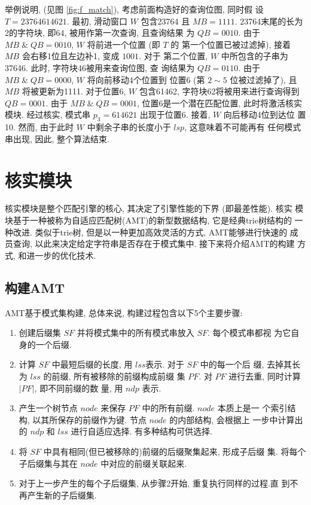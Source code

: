 \documentclass{ws-ijprai}
\begin{document}
举例说明, (见图 \ref{fig:f_match}), 考虑前面构造好的查询位图, 同时假
设 $T=23764614621$.  最初, 滑动窗口 $W$ 包含23764 且 $MB = 1111$.
23764末尾的长为2的字符块, 即64, 被用作第一次查询, 且查询结果
为 $QB=0010$. 由于 $MB\; \&\; QB = 0010$, $W$ 将前进一个位置 (即 $T$ 的
第一个位置已被过滤掉), 接着 $MB$ 会右移1位且左边补1, 变成 $1001$. 对于
第二个位置, $W$ 中所包含的子串为37646. 此时, 字符块46被用来查询位图, 查
询结果为 $QB=0110$. 由于 $MB\; \& \; QB=0000$, $W$ 将向前移动4个位置到
位置6 (第 $2 \sim 5$ 位被过滤掉了), 且 $MB$ 将被更新为1111. 对于位置6,
$W$ 包含61462, 字符块62将被用来进行查询得到 $QB = 0001$. 由于 $MB\; \&
\; QB = 0001$, 位置6是一个潜在匹配位置, 此时将激活核实模块. 经过核实,
模式串 $p_3=614621$ 出现于位置6. 接着, $W$ 向后移动4位到达位
置10. 然而, 由于此时 $W$ 中剩余子串的长度小于 $lsp$, 这意味着不可能再有
任何模式串出现, 因此, 整个算法结束.

\section{核实模块}
\label{sec:verification}

核实模块是整个匹配引擎的核心, 其决定了引擎性能的下界 (即最差性能). 核实
模块基于一种被称为自适应匹配树(AMT)的新型数据结构, 它是经典trie树结构的
一种改进. 类似于trie树, 但是以一种更加高效灵活的方式, AMT能够进行快速的
成员查询, 以此来决定给定字符串是否存在于模式集中. 接下来将介绍AMT的构建
方式, 和进一步的优化技术.

\subsection{构建AMT}
\label{subsec:amt}

AMT基于模式集构建, 总体来说, 构建过程包含以下5个主要步骤:

\begin{enumerate}
\item 创建后缀集 $SF$ 并将模式集中的所有模式串放入 $SF$. 每个模式串都视
  为它自身的一个后缀.
\item 计算 $SF$ 中最短后缀的长度, 用 $lss$表示. 对于 $SF$ 中的每一个后
  缀, 去掉其长为 $lss$ 的前缀, 所有被移除的前缀构成前缀
  集 $PF$. 对 $PF$ 进行去重, 同时计算 $|PF|$, 即不同前缀的数
  量, 用 $ndp$ 表示.
\item 产生一个树节点 $node$ 来保存 $PF$ 中的所有前缀. $node$ 本质上是一
  个索引结构, 以其所保存的前缀作为键. 节点 $node$ 的内部结构, 会根据上
  一步中计算出的 $ndp$ 和 $lss$ 进行自适应选择. 有多种结构可供选择.
\item 将 $SF$ 中具有相同(但已被移除的)前缀的后缀聚集起来, 形成子后缀
  集. 将每个子后缀集与其在 $node$ 中对应的前缀关联起来.
\item 对于上一步产生的每个子后缀集, 从步骤2开始, 重复执行同样的过程.直
  到不再产生新的子后缀集.
\end{enumerate}
\end{document}
